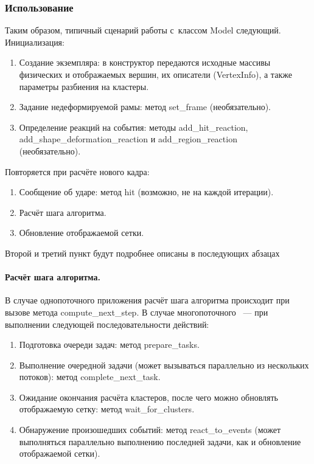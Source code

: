 \documentclass[a4paper, 14pt, titlepage]{extarticle}
\begin{document}
      \subsubsection{Использование}\label{sssec:usage}

        Таким образом, типичный сценарий работы с~классом Model следующий. Инициализация:
        \begin{enumerate}
          \item Создание экземпляра: в конструктор передаются исходные массивы физических и
          отображаемых вершин, их описатели (VertexInfo), а также параметры разбиения на кластеры.
          \item Задание недеформируемой рамы: метод set\_frame (необязательно).
          \item Определение реакций на события: методы add\_hit\_reaction,\\
          add\_shape\_deformation\_reaction и add\_region\_reaction\\
          (необязательно).
        \end{enumerate}
        Повторяется при расчёте нового кадра:
        \begin{enumerate}
          \item Сообщение об ударе: метод hit (возможно, не на каждой итерации).
          \item Расчёт шага алгоритма.
          \item Обновление отображаемой сетки.
        \end{enumerate}
        Второй и третий пункт будут подробнее описаны в последующих абзацах

        \paragraph{Расчёт шага алгоритма.}
        В случае однопоточного приложения расчёт шага алгоритма происходит при вызове метода
        compute\_next\_step. В случае многопоточного ~--- при выполнении следующей
        последовательности действий:
        \begin{enumerate}
          \item Подготовка очереди задач: метод prepare\_tasks.
          \item Выполнение очередной задачи (может вызываться параллельно из нескольких потоков): метод complete\_next\_task.
          \item Ожидание окончания расчёта кластеров, после чего можно
            обновлять отображаемую сетку: метод wait\_for\_clusters.
          \item Обнаружение произошедших событий: метод
            react\_to\_events (может выполняться параллельно выполнению последней задачи,
            как и обновление отображаемой сетки).
        \end{enumerate}
\end{document}
